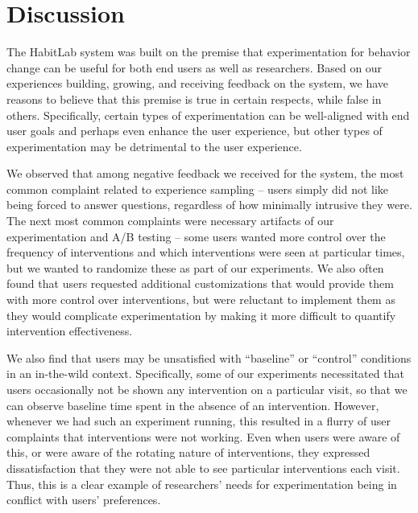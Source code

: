 \section{Discussion}

 

The HabitLab system was built on the premise that experimentation for behavior change can be useful for both end users as well as researchers. Based on our experiences building, growing, and receiving feedback on the system, we have reasons to believe that this premise is true in certain respects, while false in others. Specifically, certain types of experimentation can be well-aligned with end user goals and perhaps even enhance the user experience, but other types of experimentation may be detrimental to the user experience.

We observed that among negative feedback we received for the system, the most common complaint related to experience sampling -- users simply did not like being forced to answer questions, regardless of how minimally intrusive they were. The next most common complaints were necessary artifacts of our experimentation and A/B testing -- some users wanted more control over the frequency of interventions and which interventions were seen at particular times, but we wanted to randomize these as part of our experiments. We also often found that users requested additional customizations that would provide them with more control over interventions, but were reluctant to implement them as they would complicate experimentation by making it more difficult to quantify intervention effectiveness.

We also find that users may be unsatisfied with ``baseline'' or ``control'' conditions in an in-the-wild context. Specifically, some of our experiments necessitated that users occasionally not be shown any intervention on a particular visit, so that we can observe baseline time spent in the absence of an intervention. However, whenever we had such an experiment running, this resulted in a flurry of user complaints that interventions were not working. Even when users were aware of this, or were aware of the rotating nature of interventions, they expressed dissatisfaction that they were not able to see particular interventions each visit. Thus, this is a clear example of researchers' needs for experimentation being in conflict with users' preferences.

